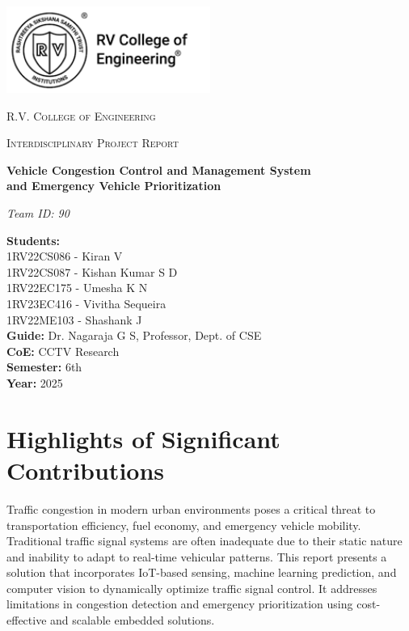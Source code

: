 \documentclass[12pt]{report}
\begin{document}
\begin{titlepage}
\centering
\includegraphics[width=0.5\textwidth]{Figures/logo.png}\\[1cm]
{\scshape\LARGE R.V. College of Engineering \par}
\vspace{1cm}
{\scshape\Large Interdisciplinary Project Report\par}
\vspace{1.5cm}
{\huge\bfseries Vehicle Congestion Control and Management System\\and Emergency Vehicle Prioritization\par}
\vspace{2cm}
{\Large\itshape Team ID: 90 \par}
\vfill
\begin{flushleft}
\textbf{Students:}\\
1RV22CS086 - Kiran V\\
1RV22CS087 - Kishan Kumar S D\\
1RV22EC175 - Umesha K N\\
1RV23EC416 - Vivitha Sequeira\\
1RV22ME103 - Shashank J\\[1cm]
\textbf{Guide:} Dr. Nagaraja G S, Professor, Dept. of CSE\\[0.5cm]
\textbf{CoE:} CCTV Research\\[1cm]
\textbf{Semester:} 6th\\
\textbf{Year:} 2025
\end{flushleft}
\vfill
\end{titlepage}

\tableofcontents
\listoffigures
\listoftables
\newpage


\vspace{-1cm}

\section*{Highlights of Significant Contributions}
Traffic congestion in modern urban environments poses a critical threat to transportation efficiency, fuel economy, and emergency vehicle mobility. Traditional traffic signal systems are often inadequate due to their static nature and inability to adapt to real-time vehicular patterns. This report presents a solution that incorporates IoT-based sensing, machine learning prediction, and computer vision to dynamically optimize traffic signal control. It addresses limitations in congestion detection and emergency prioritization using cost-effective and scalable embedded solutions.
\end{document}
